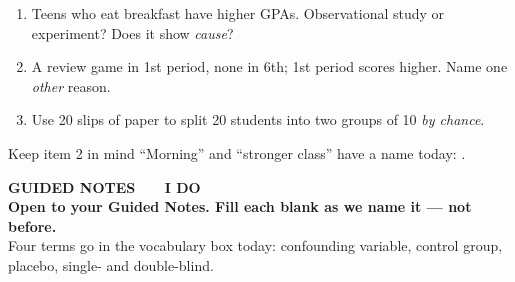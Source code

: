 \documentclass[aspectratio=169, 11pt]{beamer}
\begin{document}
\begin{frame}[t, plain]
  \begin{enumerate}\setlength{\itemsep}{8pt}
    \item Teens who eat breakfast have higher GPAs. Observational study or experiment? Does it
          show \emph{cause}?
    \item A review game in 1st period, none in 6th; 1st period scores higher. Name one
          \emph{other} reason.
    \item Use 20 slips of paper to split 20 students into two groups of 10 \emph{by chance}.
  \end{enumerate}
  \vspace{6pt}
  \begin{block}{Keep item 2 in mind}
    ``Morning'' and ``stronger class'' have a name today: .
  \end{block}
\end{frame}

{
\begin{frame}[plain]
  \vspace{1.8cm}\hspace{0.8cm}%
  \begin{minipage}{0.86\textwidth}
    {\color{goldacc}\bfseries\small GUIDED NOTES \ \textbullet\ \ I DO}\\[0.7cm]
    {\color{white}\bfseries\Large Open to your Guided Notes. Fill each blank as we name it
    --- not before.}\\[0.9cm]
    {\color{skymid}\small Four terms go in the vocabulary box today: confounding variable,
    control group, placebo, single- and double-blind.}
  \end{minipage}
\end{frame}
}
\end{document}
